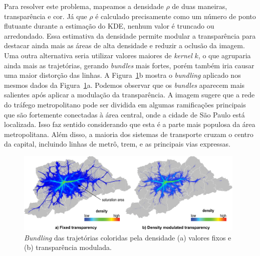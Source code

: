 Para resolver este problema, mapeamos a densidade $\rho$ de duas maneiras,
transparência e cor. Já que $\rho$ é calculado precisamente como um número
de ponto flutuante durante a estimação do KDE, nenhum valor é truncado ou arredondado.
Essa estimativa da densidade permite modular a transparência para destacar ainda
mais as áreas de alta densidade e reduzir a oclusão da imagem. Uma outra alternativa
seria utilizar valores maiores de \emph{kernel} $k$, o que agruparia ainda mais as trajetórias, gerando
\emph{bundles} mais fortes, porém também iria causar uma maior distorção das linhas.
A Figura~\ref{fig:bundled-graph-density}b mostra o \emph{bundling} aplicado nos mesmos
dados da Figura~\ref{fig:bundled-graph-density}a. Podemos observar que os \emph{bundles}
aparecem mais salientes após aplicar a modulação da transparência. A imagem sugere que a rede do tráfego metropolitano
pode ser dividida em algumas ramificações principais que são fortemente conectadas à área central,
onde a cidade de São Paulo está localizada. Isso faz sentido considerando que esta é a parte
mais populosa da área metropolitana. Além disso, a maioria dos sistemas de transporte
cruzam o centro da capital, incluindo linhas de metrô, trem, e as principais vias expressas.

\begin{figure}[!htb]
  \centering
  \captionsetup{justification=centering}
  \includegraphics[width=0.98\textwidth]{../figuras/figure1}
  \caption{\emph{Bundling} das trajetórias coloridas pela densidade (a) valores fixos e \\(b) transparência modulada.}
  \label{fig:bundled-graph-density}  
\end{figure}


